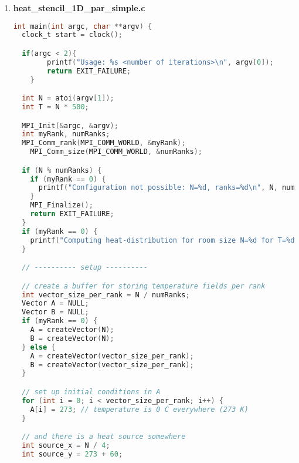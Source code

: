 \documentclass[UTF-8]{article}
\begin{document}
\begin{itemize}
\begin{enumerate}[label=\textbf{\arabic *)}]
\begin{lstlisting}[language=c]
    // pick the 'color'
    int c = ((temp - min) / (max - min)) * numColors;
    c = (c >= numColors) ? numColors - 1 : ((c < 0) ? 0 : c);

    // print the average temperature
    printf("%c", colors[c]);
  }
  // right wall
  printf("X");
}

void timings_to_csv(unsigned problem_size, double time, int numRanks) {
	FILE* fpt;
	int set_header = 0;
  char full_filepath[1024];
  sprintf(full_filepath, "%s/%s", FOLDER, FILENAME);
  if(access(FOLDER, F_OK) != 0) mkdir(FOLDER, 0755);
	if(access(full_filepath, F_OK) != 0) set_header = 1;
	fpt = fopen(full_filepath, "a+");
	if(set_header) fprintf(fpt, "Impl/Ranks,Problem Size,Time\n");
	fprintf(fpt, "par_complex/%d,%u,%.9f\n", numRanks, problem_size, time);
	fclose(fpt);
}
\end{lstlisting}
                \item \textbf{heat\_stencil\_1D\_par\_simple.c}
\begin{lstlisting}[language=c]
int main(int argc, char **argv) {
  clock_t start = clock();

  if(argc < 2){
		printf("Usage: %s <number of iterations>\n", argv[0]);
		return EXIT_FAILURE;
	}

  int N = atoi(argv[1]);
  int T = N * 500;

  MPI_Init(&argc, &argv);
  int myRank, numRanks;
  MPI_Comm_rank(MPI_COMM_WORLD, &myRank);
	MPI_Comm_size(MPI_COMM_WORLD, &numRanks);

  if (N % numRanks) {
    if (myRank == 0) {
      printf("Configuration not possible: N=%d, ranks=%d\n", N, numRanks);
    }
    MPI_Finalize();
    return EXIT_FAILURE;
  }
  if (myRank == 0) {
    printf("Computing heat-distribution for room size N=%d for T=%d timesteps\n", N, T);
  }

  // ---------- setup ----------

  // create a buffer for storing temperature fields per rank
  int vector_size_per_rank = N / numRanks;
  Vector A = NULL;
  Vector B = NULL;
  if (myRank == 0) {
    A = createVector(N);
    B = createVector(N);
  } else {
    A = createVector(vector_size_per_rank);
    B = createVector(vector_size_per_rank);
  }

  // set up initial conditions in A
  for (int i = 0; i < vector_size_per_rank; i++) {
    A[i] = 273; // temperature is 0 C everywhere (273 K)
  }

  // and there is a heat source somewhere
  int source_x = N / 4;
  int source_y = 273 + 60;


\end{lstlisting}
\end{enumerate}
\end{itemize}
\end{document}
